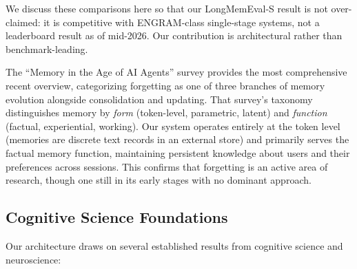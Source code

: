 \documentclass[11pt,a4paper]{article}
\begin{document}
We discuss these comparisons here so that our LongMemEval-S result is not over-claimed: it is competitive with ENGRAM-class single-stage systems, not a leaderboard result as of mid-2026. Our contribution is architectural rather than benchmark-leading.

The ``Memory in the Age of AI Agents'' survey \citep{liu2025memory} provides the most comprehensive recent overview, categorizing forgetting as one of three branches of memory evolution alongside consolidation and updating. That survey's taxonomy distinguishes memory by \emph{form} (token-level, parametric, latent) and \emph{function} (factual, experiential, working). Our system operates entirely at the token level (memories are discrete text records in an external store) and primarily serves the factual memory function, maintaining persistent knowledge about users and their preferences across sessions. This confirms that forgetting is an active area of research, though one still in its early stages with no dominant approach.

\subsection{Cognitive Science Foundations}

Our architecture draws on several established results from cognitive science and neuroscience:
\end{document}
